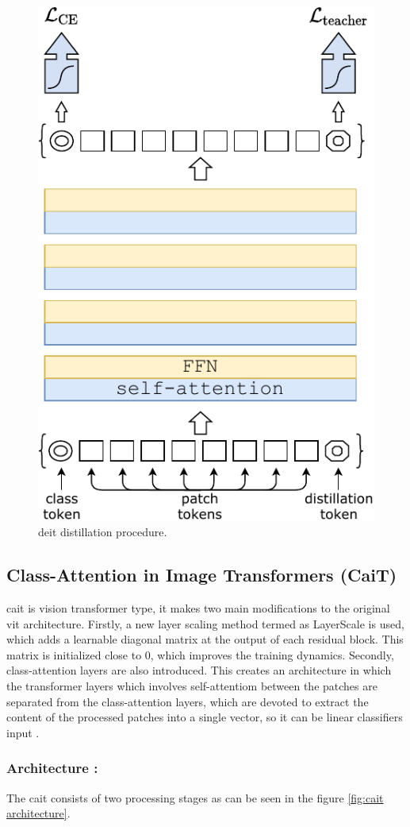 \begin{figure}[ht!]
    \centering
    \includegraphics[width=0.5\linewidth]{Rohit_Master_Thesis//Images/deit_distillation_token.pdf}
    \caption{\gls{deit} distillation procedure\cite{pmlr-v139-touvron21a}.}
    \label{fig:deit distillation token}
\end{figure}

\subsection{Class-Attention in Image Transformers (CaiT)}

\gls{cait} is vision transformer type, it makes two main modifications to the original \gls{vit} architecture. Firstly, a new layer scaling method termed as LayerScale is used, which adds a learnable diagonal matrix at the output of each residual block. This matrix is initialized close to 0, which improves the training dynamics. Secondly, class-attention layers are also introduced. This creates an architecture in which the transformer layers which involves self-attentiom between the patches are separated from the class-attention layers, which are devoted to extract the content of the processed patches into a single vector, so it can be linear classifiers input \cite{touvron2021going}. 

\subsubsection*{Architecture :}

The \gls{cait} consists of two processing stages as can be seen in the figure \ref{fig:cait architecture}.

